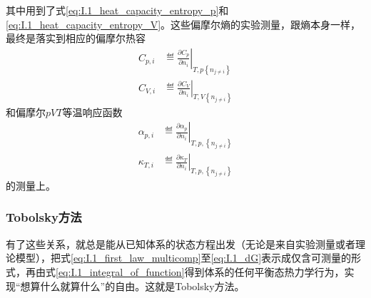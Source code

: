 \documentclass[main.tex]{subfiles}
\begin{document}
其中用到了式\eqref{eq:I.1_heat_capacity_entropy_p}和\eqref{eq:I.1_heat_capacity_entropy_V}。这些偏摩尔熵的实验测量，跟熵本身一样，最终是落实到相应的偏摩尔热容
\begin{align}
    C_{p,i} & \eqdef\left.\frac{\partial C_p}{\partial n_i}\right|_{T,p\left\{n_{j\neq i}\right\}} \label{eq:I.1_def_Cpi} \\
    C_{V,i} & \eqdef\left.\frac{\partial C_V}{\partial n_i}\right|_{T,V\left\{n_{j\neq i}\right\}}\label{eq:I.1_def_CVi}
\end{align}
和偏摩尔$pVT$等温响应函数
\begin{align}
    \alpha_{p,i} & \eqdef\left.\frac{\partial \alpha_p}{\partial n_i}\right|_{T,p,\left\{n_{j\neq i}\right\}}\label{eq:I.1_def_partial_molar_expansion_coeff} \\
    \kappa_{T,i} & \eqdef\left.\frac{\partial \kappa_T}{\partial n_i}\right|_{T,p,\left\{n_{j\neq i}\right\}}\label{eq:I.1_def_partial_molar_compressibility}
\end{align}
的测量上。

\subsubsection{Tobolsky方法}
有了这些关系，就总是能从已知体系的状态方程出发（无论是来自实验测量或者理论模型），把式\eqref{eq:I.1_first_law_multicomp}至\eqref{eq:I.1_dG}表示成仅含可测量的形式，再由式\eqref{eq:I.1_integral_of_function}得到体系的任何平衡态热力学行为，实现“想算什么就算什么”的自由。这就是Tobolsky方法。
\end{document}
